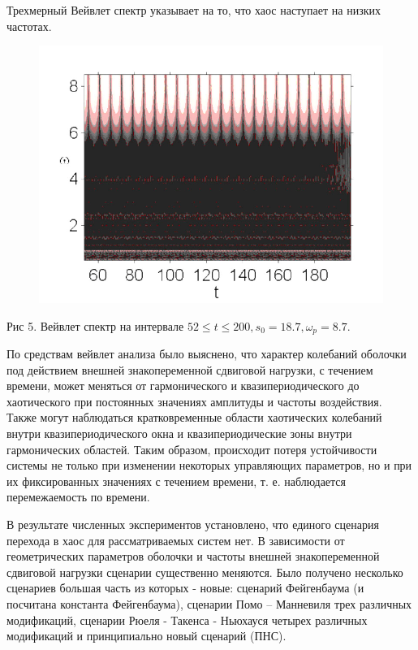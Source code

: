 \documentclass[12pt,letterpaper]{extreport}
\begin{document}
\par Трехмерный Вейвлет спектр указывает на то, что 
хаос наступает на низких 
частотах.

\begin{center}
\begin{figure}
\centering
\includegraphics[scale=0.5]{ris5}
\end{figure}
Рис 5. Вейвлет спектр на интервале $52\leq t \leq 
200, s_0=18.7, \omega_p = 
8.7.$
\end{center}

\par По средствам вейвлет анализа было выяснено, 
что характер колебаний 
оболочки под действием внешней знакопеременной 
сдвиговой нагрузки, с течением 
времени, может меняться от гармонического и 
квазипериодического до хаотического
при постоянных значениях амплитуды и частоты 
воздействия. Также могут 
наблюдаться кратковременные области хаотических 
колебаний
внутри квазипериодического окна и 
квазипериодические зоны внутри гармонических 
областей. Таким образом, происходит потеря 
устойчивости системы не только при 
изменении некоторых управляющих параметров, но и 
при их фиксированных значениях
с течением времени, т. е. наблюдается 
перемежаемость по времени.

\par В результате численных экспериментов 
установлено, что единого сценария
перехода в хаос для рассматриваемых систем нет. В 
зависимости от геометрических
параметров оболочки и частоты внешней 
знакопеременной сдвиговой нагрузки
сценарии существенно меняются. Было получено 
несколько сценариев большая часть
из которых - новые: сценарий Фейгенбаума (и 
посчитана константа Фейгенбаума),
сценарии Помо – Манневиля трех различных 
модификаций, сценарии Рюеля - Такенса
- Ньюхауся четырех различных модификаций и 
принципиально новый сценарий 
(ПНС).\\
\end{document}
